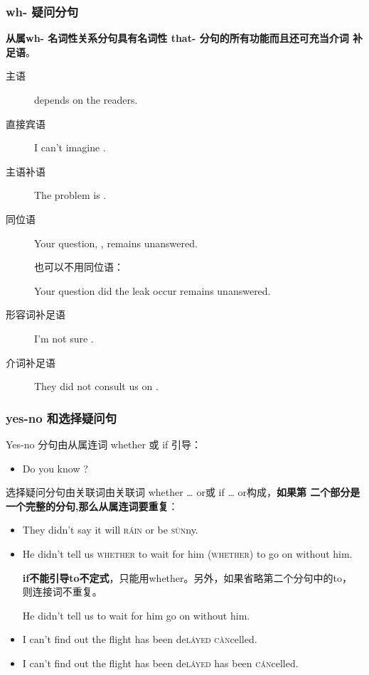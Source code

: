 \subsubsection{wh- 疑问分句}


\textbf{从属wh- 名词性关系分句具有名词性 that- 分句的所有功能而且还可充当介词
  补足语}。

\begin{description}
\item[主语]  depends on the readers.

\item[直接宾语] I can't imagine .

\item[主语补语] The problem is .

\item[同位语] Your question, , remains unanswered.

  也可以不用同位语：

  Your question  did the leak occur remains unanswered.

\item[形容词补足语] I'm not sure .

\item[介词补足语] They did not consult us on .
\end{description}

\subsubsection{yes-no 和选择疑问句}

Yes-no 分句由从属连词 whether 或 if 引导：
\begin{itemize}
\item Do you know ?
\end{itemize}

选择疑问分句由关联词由关联词 whether \ldots{} or或 if \ldots{} or构成，\textbf{如果第
二个部分是一个完整的分句,那么从属连词要重复}：
\begin{itemize}
\item They didn't say  it will \textsc{r\'ain} or be \textsc{s\`un}ny.
\item He didn't tell us \textsc{whether} to wait for him 
  \textsc{(whether)} to go on without him.

  \textbf{if不能引导to不定式}，只能用whether。另外，如果省略第二个分句中的to，
  则连接词不重复。

  He didn't tell us  to wait for him  go on without him.

\item I can't find out  the flight has been de\textsc{l\'ayed}
   \textsc{c\`an}celled.

\item I can't find out  the flight has been de\textsc{l\'ayed} 
   has been \textsc{c\'an}celled.

\end{itemize}

